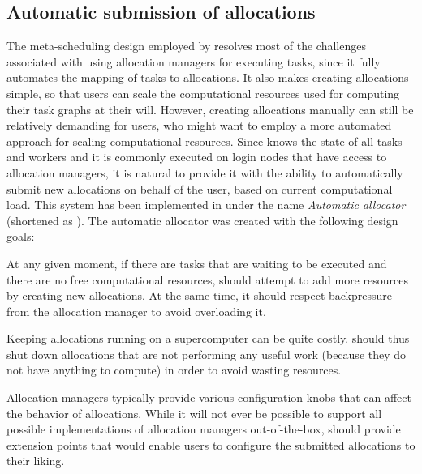 \subsection{Automatic submission of allocations}
\label{hq:automatic-allocation}
The meta-scheduling design employed by \hyperqueue{} resolves most of the challenges
associated with using allocation managers for executing tasks, since it fully automates the mapping
of tasks to allocations. It also makes creating allocations simple, so that users can scale the
computational resources used for computing their task graphs at their will. However, creating
allocations manually can still be relatively demanding for users, who might want to employ a more
automated approach for scaling computational resources. Since \hyperqueue{} knows the
state of all tasks and workers and it is commonly executed on login nodes that have access to
allocation managers, it is natural to provide it with the ability to automatically submit new
allocations on behalf of the user, based on current computational load. This system has been
implemented in \hq{} under the name \emph{Automatic allocator} (shortened as \autoalloc{}). The automatic
allocator was created with the following design goals:

\begin{description}[wide=0pt,itemsep=0pt,topsep=2pt]
	\item[Allow computational resources to scale up] At any given moment, if there are tasks that are waiting to be executed and there are no free
		computational resources, \autoalloc{} should attempt to add more resources by creating
		new allocations. At the same time, it should respect backpressure from the allocation manager to
		avoid overloading it.
	\item[Allow computational resources to scale down] Keeping allocations running on a supercomputer can be quite costly. \Autoalloc{} should
		thus shut down allocations that are not performing any useful work (because they do not have
		anything to compute) in order to avoid wasting resources.
	\item[Be flexible] Allocation managers typically provide various configuration knobs that can affect the behavior of
		allocations. While it will not ever be possible to support all possible implementations of
		allocation managers out-of-the-box, \autoalloc{} should provide extension points that
		would enable users to configure the submitted allocations to their liking.
\end{description}

